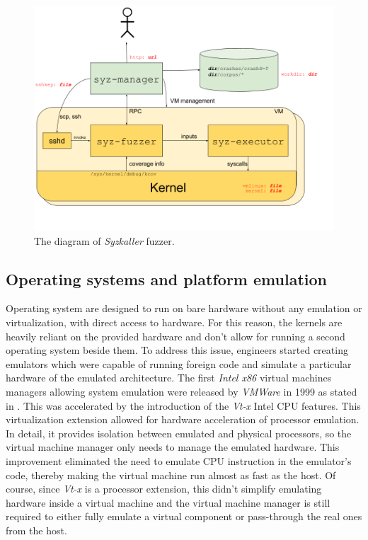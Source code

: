 \begin{figure}
    \centering
    \includegraphics[width=.9\linewidth]{tex/img/syz.png}
    \caption{The diagram of \textit{Syzkaller} fuzzer.}
    \label{fig:syz}
\end{figure}

\subsection{Operating systems and platform emulation}
Operating system are designed to run on bare hardware without any emulation or virtualization, with direct access to hardware. For this reason, the kernels are heavily reliant on the provided hardware and don't allow for running a second operating system beside them. To address this issue, engineers started creating emulators which were capable of running foreign code and simulate a particular hardware of the emulated architecture. The first \textit{Intel x86} virtual machines managers allowing system emulation were released by \textit{VMWare} in 1999 as stated in \cite{vms}. This was accelerated by the introduction of the \textit{Vt-x} Intel CPU features. This virtualization extension allowed for hardware acceleration of processor emulation. In detail, it provides isolation between emulated and physical processors, so the virtual machine manager only needs to manage the emulated hardware. This improvement eliminated the need to emulate CPU instruction in the emulator's code, thereby making the virtual machine run almost as fast as the host. Of course, since \textit{Vt-x} is a processor extension, this didn't simplify emulating hardware inside a virtual machine and the virtual machine manager is still required to either fully emulate a virtual component or pass-through the real ones from the host. 


